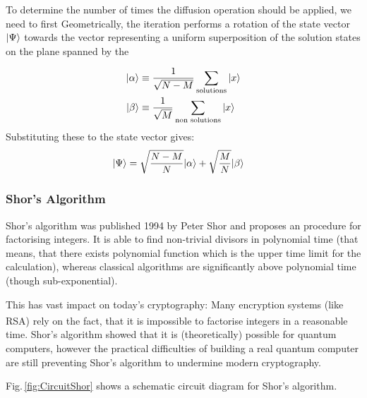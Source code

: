 \documentclass[bibliography=totocnumbered]{article}
\newcommand{\citeS}[1]{\textsuperscript{\cite{#1}}}
\theoremstyle{NoticeStyle}
\begin{document}
To determine the number of times the diffusion operation should be applied, we need to first
Geometrically, the iteration performs a rotation of the state vector ${\left\vert{\Psi}\right\rangle}$ towards the vector representing a uniform superposition of the solution states on the plane spanned by the 

\begin{align}
	{\left\vert{\alpha}\right\rangle} &\equiv \frac{1}{\sqrt{N-M}} \sum_\textrm{solutions} {\left\vert{x}\right\rangle}\\
	{\left\vert{\beta}\right\rangle} &\equiv \frac{1}{\sqrt{M}} \sum_\textrm{non solutions} {\left\vert{x}\right\rangle}
\end{align}
Substituting these to the state vector gives:
\begin{align}
	{\left\vert{\Psi}\right\rangle} &= \sqrt{\frac{N-M}{N}}{\left\vert{\alpha}\right\rangle} +\sqrt{\frac{M}{N}}{\left\vert{\beta}\right\rangle}
\end{align}

\subsubsection{Shor's Algorithm}

Shor's algorithm was published 1994 by Peter Shor and proposes an procedure for factorising integers. It is able to find non-trivial divisors in polynomial time (that means, that there exists polynomial function which is the upper time limit for the calculation), whereas classical algorithms are significantly above polynomial time (though sub-exponential).

This has vast impact on today's cryptography: Many encryption systems (like RSA)\citeS{RSAcrypto} rely on the fact, that it is impossible to factorise integers in a reasonable time. Shor's algorithm showed that it is (theoretically) possible for quantum computers, however the practical difficulties of building a real quantum computer are still preventing Shor's algorithm to undermine modern cryptography.


Fig.\,\ref{fig:CircuitShor} shows a schematic circuit diagram for Shor's algorithm.
\end{document}

